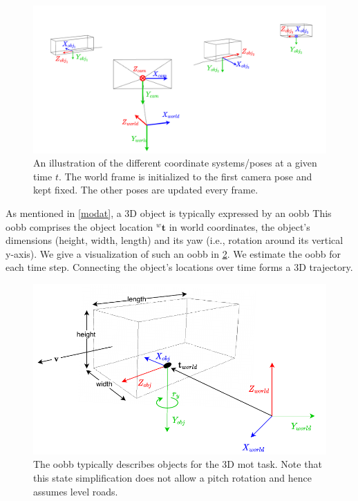 \documentclass[headsepline, hidelinks, footsepline, footinclude=false, oneside, fontsize=11pt, paper=a4, listof=totoc, bibliography=totoc]{scrbook}
\begin{document}
\begin{figure}[htbp]
\centering
\includegraphics[width=.9\linewidth]{figures/cosys.pdf}
\caption{\label{fig:cosys}An illustration of the different coordinate systems/poses at a given time \(t\). The world frame is initialized to the first camera pose and kept fixed. The other poses are updated every frame.}
\end{figure}

As mentioned in \cref{modat}, a 3D object is typically expressed by an \gls{oobb}
This \gls{oobb} comprises the object location \({}^w\mathbf{t}\) in world coordinates, the object's dimensions (height, width, length) and its yaw (i.e., rotation around its vertical y-axis). 
We give a visualization of such an \gls{oobb} in \cref{fig:oobb}.
We estimate the \gls{oobb} for each time step. Connecting the object's locations over time forms a 3D trajectory.

\begin{figure}[htbp]
\centering
\includegraphics[width=.9\linewidth]{figures/oobb.pdf}
\caption{\label{fig:oobb}The \gls{oobb} typically describes objects for the 3D \gls{mot} task. Note that this state simplification does not allow a pitch rotation and hence assumes level roads.}
\end{figure}
\end{document}
